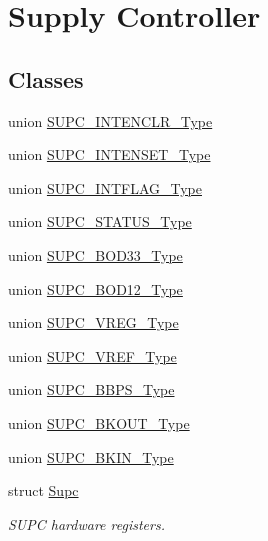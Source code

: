 \hypertarget{group___s_a_m_l21___s_u_p_c}{}\section{Supply Controller}
\label{group___s_a_m_l21___s_u_p_c}
\subsection*{Classes}
\begin{DoxyCompactItemize}
\item 
union \hyperlink{union_s_u_p_c___i_n_t_e_n_c_l_r___type}{S\+U\+P\+C\+\_\+\+I\+N\+T\+E\+N\+C\+L\+R\+\_\+\+Type}
\item 
union \hyperlink{union_s_u_p_c___i_n_t_e_n_s_e_t___type}{S\+U\+P\+C\+\_\+\+I\+N\+T\+E\+N\+S\+E\+T\+\_\+\+Type}
\item 
union \hyperlink{union_s_u_p_c___i_n_t_f_l_a_g___type}{S\+U\+P\+C\+\_\+\+I\+N\+T\+F\+L\+A\+G\+\_\+\+Type}
\item 
union \hyperlink{union_s_u_p_c___s_t_a_t_u_s___type}{S\+U\+P\+C\+\_\+\+S\+T\+A\+T\+U\+S\+\_\+\+Type}
\item 
union \hyperlink{union_s_u_p_c___b_o_d33___type}{S\+U\+P\+C\+\_\+\+B\+O\+D33\+\_\+\+Type}
\item 
union \hyperlink{union_s_u_p_c___b_o_d12___type}{S\+U\+P\+C\+\_\+\+B\+O\+D12\+\_\+\+Type}
\item 
union \hyperlink{union_s_u_p_c___v_r_e_g___type}{S\+U\+P\+C\+\_\+\+V\+R\+E\+G\+\_\+\+Type}
\item 
union \hyperlink{union_s_u_p_c___v_r_e_f___type}{S\+U\+P\+C\+\_\+\+V\+R\+E\+F\+\_\+\+Type}
\item 
union \hyperlink{union_s_u_p_c___b_b_p_s___type}{S\+U\+P\+C\+\_\+\+B\+B\+P\+S\+\_\+\+Type}
\item 
union \hyperlink{union_s_u_p_c___b_k_o_u_t___type}{S\+U\+P\+C\+\_\+\+B\+K\+O\+U\+T\+\_\+\+Type}
\item 
union \hyperlink{union_s_u_p_c___b_k_i_n___type}{S\+U\+P\+C\+\_\+\+B\+K\+I\+N\+\_\+\+Type}
\item 
struct \hyperlink{struct_supc}{Supc}
\begin{DoxyCompactList}\small\item\em S\+U\+P\+C hardware registers. \end{DoxyCompactList}\end{DoxyCompactItemize}
